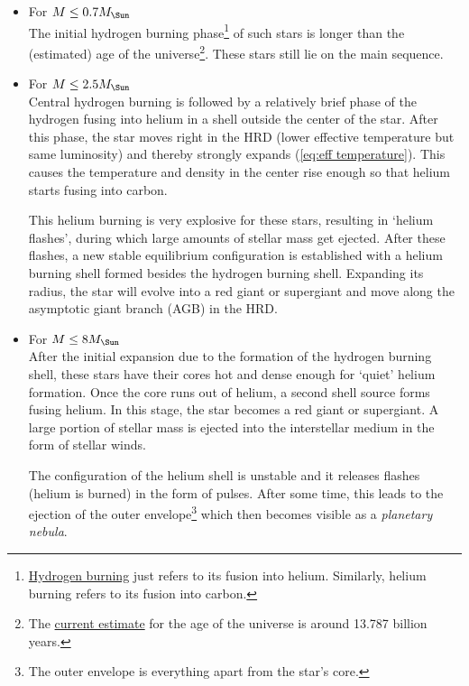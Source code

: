 \documentclass[a4paper,11pt]{report}
\newcommand{\ti}[1]{\textit{#1}}
\newcommand{\MS}{M_\text{\Sun}}
\begin{document}
\begin{itemize}[label=$\bullet$, itemsep=1.2em] 
  \item For $M \le 0.7 \MS$ \\[0.2em]
    The initial hydrogen burning phase\footnote{\href{https://en.wikipedia.org/wiki/Stellar_nucleosynthesis\#Hydrogen_fusion}{Hydrogen burning} just refers to its fusion into helium. Similarly, helium burning refers to its fusion into carbon.} of such stars is longer than the (estimated) age of the universe\footnote{The \href{https://en.wikipedia.org/wiki/Age_of_the_universe}{current estimate} for the age of the universe is around 13.787 billion years.}. These stars still lie on the main sequence.
    
  \item For $M \le 2.5 \MS$ \\[0.2em]
    Central hydrogen burning is followed by a relatively brief phase of the hydrogen fusing into helium in a shell outside the center of the star. After this phase, the star moves right in the HRD (lower effective temperature but same luminosity) and thereby strongly expands (\ref{eq:eff temperature}). This causes the temperature and density in the center rise enough so that helium starts fusing into carbon.

    \vspace{1em}

    This helium burning is very explosive for these stars, resulting in `helium flashes', during which large amounts of stellar mass get ejected. After these flashes, a new stable equilibrium configuration is established with a helium burning shell formed besides the hydrogen burning shell. Expanding its radius, the star will evolve into a red giant or supergiant and move along the asymptotic giant branch (AGB) in the HRD.
    
  \item For $M \le 8 \MS$ \\[0.2em]
    After the initial expansion due to the formation of the hydrogen burning shell, these stars have their cores hot and dense enough for `quiet' helium formation. Once the core runs out of helium, a second shell source forms fusing helium. In this stage, the star becomes a red giant or supergiant. A large portion of stellar mass is ejected into the interstellar medium in the form of stellar winds.

    \vspace{1em}

    The configuration of the helium shell is unstable and it releases flashes (helium is burned) in the form of pulses. After some time, this leads to the ejection of the outer envelope\footnote{The outer envelope is everything apart from the star's core.} which then becomes visible as a \ti{planetary nebula}.


\end{itemize}
\end{document}
